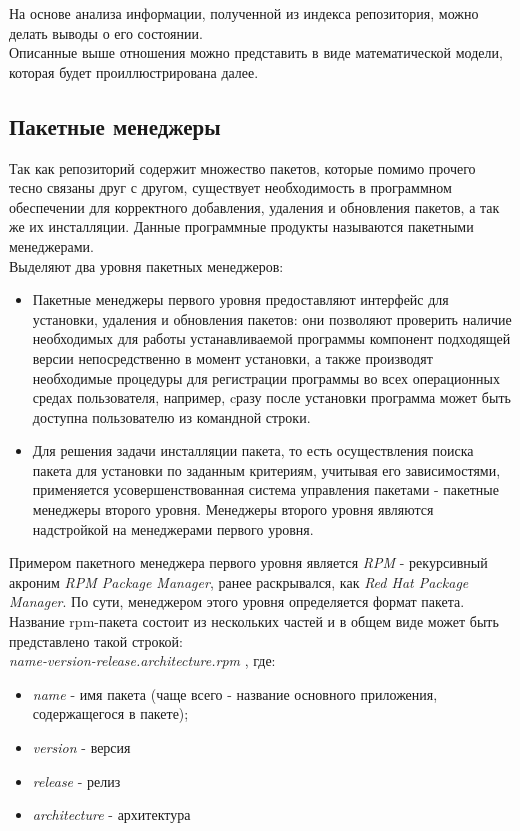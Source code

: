 На основе анализа информации, полученной из индекса репозитория,
можно делать выводы о его состоянии. \\

Описанные выше отношения можно представить в виде математической модели,
которая будет проиллюстрирована далее.


\subsection{Пакетные менеджеры}
Так как репозиторий содержит множество пакетов, которые помимо прочего тесно
связаны друг с другом, существует необходимость в программном обеспечении для
корректного добавления, удаления и обновления пакетов, а так же их инсталляции.
Данные программные продукты называются пакетными менеджерами.\\

Выделяют два уровня пакетных менеджеров:
\begin{itemize}
\item{Пакетные менеджеры первого уровня предоставляют интерфейс для установки,
удаления и обновления пакетов: они позволяют проверить наличие необходимых для
работы устанавливаемой программы компонент подходящей версии непосредственно 
в момент установки, а также производят необходимые процедуры для регистрации 
программы во всех операционных средах пользователя, например, cразу после установки 
программа может быть доступна пользователю из командной строки.}
\item{Для решения задачи инсталляции пакета, то есть осуществления поиска пакета для
установки по заданным критериям, учитывая его зависимостями, применяется усовершенствованная
система управления пакетами - пакетные менеджеры второго уровня. Менеджеры второго уровня 
являются надстройкой на менеджерами первого уровня.}
\end{itemize}

Примером пакетного менеджера первого уровня является  \textit{RPM}  - рекурсивный акроним 
\textit{RPM Package Manager}, ранее раскрывался, как \textit{Red Hat Package Manager}.
По сути, менеджером этого уровня определяется формат пакета.\\

Название rpm-пакета состоит из нескольких частей и в общем виде может быть представлено
такой строкой: \\
\textit{name-version-release.architecture.rpm} , где:
\begin{itemize}
\item{\textit{name} - имя пакета (чаще всего - название основного приложения, содержащегося в пакете);}
\item{\textit{version} - версия}
\item{\textit{release} - релиз}
\item{\textit{architecture} - архитектура}
\end{itemize}


